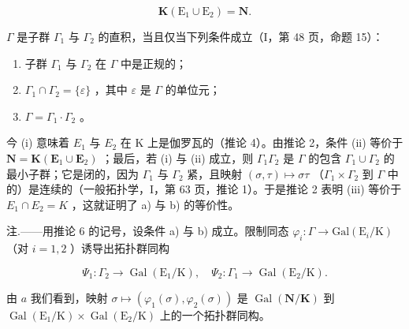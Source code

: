 \[
\mathbf {K} \left(\mathrm{E} _ {1} \cup \mathrm{E} _ {2}\right) = \mathbf {N}.
\]

\(\Gamma\) 是子群 \(\Gamma_{1}\) 与 \(\Gamma_{2}\) 的直积，当且仅当下列条件成立（I，第 48 页，命题 15）：

\begin{enumerate}
\def\labelenumi{(\roman{enumi})}
\item
  子群 \(\Gamma_{1}\) 与 \(\Gamma_{2}\) 在 \(\Gamma\) 中是正规的；
\item
  \(\Gamma_1 \cap \Gamma_2 = \{\varepsilon\}\) ，其中 \(\varepsilon\) 是 \(\Gamma\) 的单位元；
\item
  \(\Gamma = \Gamma_{1} \cdot \Gamma_{2}\) 。
\end{enumerate}

今 (i) 意味着 \(E_{1}\) 与 \(E_{2}\) 在 K 上是伽罗瓦的（推论 4）。由推论 2，条件 (ii) 等价于 \(\mathbf{N} = \mathbf{K}(\mathbf{E}_{1} \cup \mathbf{E}_{2})\) ；最后，若 (i) 与 (ii) 成立，则 \(\Gamma_{1}\Gamma_{2}\) 是 \(\Gamma\) 的包含 \(\Gamma_{1} \cup \Gamma_{2}\) 的最小子群；它是闭的，因为 \(\Gamma_{1}\) 与 \(\Gamma_{2}\) 紧，且映射 \((\sigma, \tau) \mapsto \sigma\tau\) （\(\Gamma_{1} \times \Gamma_{2}\) 到 \(\Gamma\) 中的）是连续的（一般拓扑学，I，第 63 页，推论 1）。于是推论 2 表明 (iii) 等价于 \(E_{1} \cap E_{2} = K\) ，这就证明了 a) 与 b) 的等价性。

注.——用推论 6 的记号，设条件 a) 与 b) 成立。限制同态 \(\varphi_{i}:\Gamma\to\mathrm{Gal}(\mathrm{E}_{i}/\mathrm{K})\) （对 \(i=1,2\) ）诱导出拓扑群同构

\[
\Psi_ {1}: \Gamma_ {2} \rightarrow \operatorname{Gal} \left(\mathrm{E} _ {1} / \mathrm{K}\right), \quad \Psi_ {2}: \Gamma_ {1} \rightarrow \operatorname{Gal} \left(\mathrm{E} _ {2} / \mathrm{K}\right).
\]

由 \(a\) 我们看到，映射 \(\sigma \mapsto (\varphi_1(\sigma), \varphi_2(\sigma))\) 是 \(\operatorname{Gal}(\mathbf{N}/\mathbf{K})\) 到 \(\operatorname{Gal}(\mathrm{E}_1/\mathrm{K}) \times \operatorname{Gal}(\mathrm{E}_2/\mathrm{K})\) 上的一个拓扑群同构。
\relax{}
